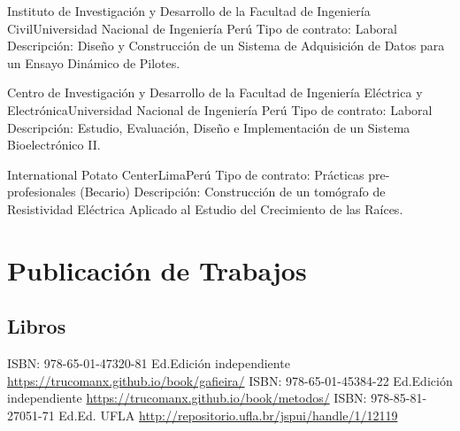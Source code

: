 \documentclass[11pt,a4paper,sans]{moderncv} %
\begin{document}
		      {Instituto de Investigación y Desarrollo de la Facultad
 de Ingeniería Civil}{Universidad Nacional de Ingeniería }{Perú}
		      {Tipo de contrato: Laboral\newline{}
		      Descripción: Diseño y Construcción de un Sistema de Adquisición de Datos para un Ensayo  Dinámico  de  Pilotes.}

		      {Centro de Investigación y Desarrollo de la Facultad de
 Ingeniería Eléctrica y Electrónica}{Universidad Nacional de Ingeniería }{Perú}
		      {Tipo de contrato: Laboral\newline{}
		      Descripción: Estudio, Evaluación, Diseño e Implementación de un Sistema Bioelectrónico II.}

		      {International Potato Center}{Lima}{Perú}
		      {Tipo de contrato: Prácticas pre-profesionales (Becario)\newline{}
		      Descripción: Construcción de un tomógrafo de Resistividad Eléctrica Aplicado al Estudio del Crecimiento de las Raíces.}


\section{Publicación de Trabajos}
\subsection{Libros}
	      {ISBN: 978-65-01-47320-8}{1 Ed.}{Edición independiente}
	      {\url{https://trucomanx.github.io/book/gafieira/}}
	      {ISBN: 978-65-01-45384-2}{2 Ed.}{Edición independiente}
	      {\url{https://trucomanx.github.io/book/metodos/}}
	      {ISBN: 978-85-81-27051-7}{1 Ed.}{Ed. UFLA}
	      {\url{http://repositorio.ufla.br/jspui/handle/1/12119}}
\end{document}
